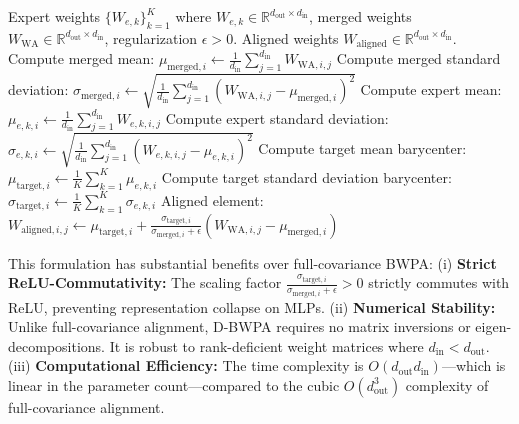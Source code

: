 \documentclass{article}
\providecommand{\TO}{\textbf{to}}
\theoremstyle{plain}
\theoremstyle{definition}
\theoremstyle{remark}
\begin{document}
\begin{algorithm}[h]
\caption{Diagonal Bures-Wasserstein Parameter Alignment (D-BWPA)}
\label{alg:dbwpa}
\begin{footnotesize}
\begin{algorithmic}[1]
\REQUIRE Expert weights $\{W_{e, k}\}_{k=1}^K$ where $W_{e, k} \in \mathbb{R}^{d_{\text{out}} \times d_{\text{in}}}$, merged weights $W_{\text{WA}} \in \mathbb{R}^{d_{\text{out}} \times d_{\text{in}}}$, regularization $\epsilon > 0$.
\ENSURE Aligned weights $W_{\text{aligned}} \in \mathbb{R}^{d_{\text{out}} \times d_{\text{in}}}$.
\FOR{$i = 1$ \TO $d_{\text{out}}$}
  \STATE Compute merged mean: $\mu_{\text{merged}, i} \gets \frac{1}{d_{\text{in}}} \sum_{j=1}^{d_{\text{in}}} W_{\text{WA}, i, j}$
  \STATE Compute merged standard deviation: $\sigma_{\text{merged}, i} \gets \sqrt{\frac{1}{d_{\text{in}}} \sum_{j=1}^{d_{\text{in}}} (W_{\text{WA}, i, j} - \mu_{\text{merged}, i})^2}$
  \FOR{$k = 1$ \TO $K$}
    \STATE Compute expert mean: $\mu_{e, k, i} \gets \frac{1}{d_{\text{in}}} \sum_{j=1}^{d_{\text{in}}} W_{e, k, i, j}$
    \STATE Compute expert standard deviation: $\sigma_{e, k, i} \gets \sqrt{\frac{1}{d_{\text{in}}} \sum_{j=1}^{d_{\text{in}}} (W_{e, k, i, j} - \mu_{e, k, i})^2}$
  \ENDFOR
  \STATE Compute target mean barycenter: $\mu_{\text{target}, i} \gets \frac{1}{K} \sum_{k=1}^K \mu_{e, k, i}$
  \STATE Compute target standard deviation barycenter: $\sigma_{\text{target}, i} \gets \frac{1}{K} \sum_{k=1}^K \sigma_{e, k, i}$
  \FOR{$j = 1$ \TO $d_{\text{in}}$}
    \STATE Aligned element: $W_{\text{aligned}, i, j} \gets \mu_{\text{target}, i} + \frac{\sigma_{\text{target}, i}}{\sigma_{\text{merged}, i} + \epsilon} (W_{\text{WA}, i, j} - \mu_{\text{merged}, i})$
  \ENDFOR
\ENDFOR
\end{algorithmic}
\end{footnotesize}
\end{algorithm}

This formulation has substantial benefits over full-covariance BWPA: (i) \textbf{Strict ReLU-Commutativity:} The scaling factor $\frac{\sigma_{\text{target}, i}}{\sigma_{\text{merged}, i} + \epsilon} > 0$ strictly commutes with ReLU, preventing representation collapse on MLPs. (ii) \textbf{Numerical Stability:} Unlike full-covariance alignment, D-BWPA requires no matrix inversions or eigen-decompositions. It is robust to rank-deficient weight matrices where $d_{\text{in}} < d_{\text{out}}$. (iii) \textbf{Computational Efficiency:} The time complexity is $O(d_{\text{out}} d_{\text{in}})$—which is linear in the parameter count—compared to the cubic $O(d_{\text{out}}^3)$ complexity of full-covariance alignment.
\end{document}
